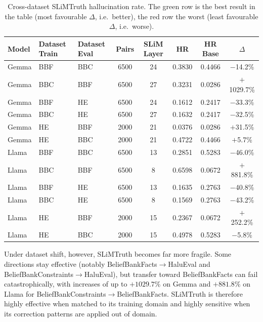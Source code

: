 \begin{table}[H]
\centering
\footnotesize
\setlength{\tabcolsep}{4pt}
\begin{tabular}{lllccccc}
\toprule
\textbf{Model} & \textbf{Dataset Train} & \textbf{Dataset Eval} & \textbf{Pairs} & \textbf{SLiM Layer} & \textbf{HR} & \textbf{HR Base} & \textbf{$\Delta$} \\
\midrule
Gemma & BBF & BBC & 6500 & 24 & 0.3830 & 0.4466 & $-$14.2\% \\
\rowcolor{red!25}Gemma & BBC & BBF & 6500 & 27 & 0.3231 & 0.0286 & $+$1029.7\% \\
Gemma & BBF & HE  & 6500 & 24 & 0.1612 & 0.2417 & $-$33.3\% \\
Gemma & BBC & HE  & 6500 & 27 & 0.1632 & 0.2417 & $-$32.5\% \\
Gemma & HE  & BBF & 2000 & 21 & 0.0376 & 0.0286 & $+$31.5\% \\
Gemma & HE  & BBC & 2000 & 21 & 0.4722 & 0.4466 & $+$5.7\% \\
\midrule
\rowcolor{green!25}Llama & BBF & BBC & 6500 & 13 & 0.2851 & 0.5283 & $-$46.0\% \\
Llama & BBC & BBF & 6500 & 8  & 0.6598 & 0.0672 & $+$881.8\% \\
Llama & BBF & HE  & 6500 & 13 & 0.1635 & 0.2763 & $-$40.8\% \\
Llama & BBC & HE  & 6500 & 8  & 0.1569 & 0.2763 & $-$43.2\% \\
Llama & HE  & BBF & 2000 & 15 & 0.2367 & 0.0672 & $+$252.2\% \\
Llama & HE  & BBC & 2000 & 15 & 0.4978 & 0.5283 & $-$5.8\% \\
\bottomrule
\end{tabular}
\caption{Cross-dataset SLiMTruth hallucination rate. The green row is the best result in the table (most favourable $\Delta$, i.e.\ better), the red row the worst (least favourable $\Delta$, i.e.\ worse).}
\label{tab:slim-cross-dataset}
\end{table}

Under dataset shift, however, SLiMTruth becomes far more fragile. Some directions stay effective (notably BeliefBankFacts$\rightarrow$HaluEval and BeliefBankConstraints$\rightarrow$HaluEval), but transfer toward BeliefBankFacts can fail catastrophically, with increases of up to $+1029.7\%$ on Gemma and $+881.8\%$ on Llama for BeliefBankConstraints$\rightarrow$BeliefBankFacts. SLiMTruth is therefore highly effective when matched to its training domain and highly sensitive when its correction patterns are applied out of domain.

